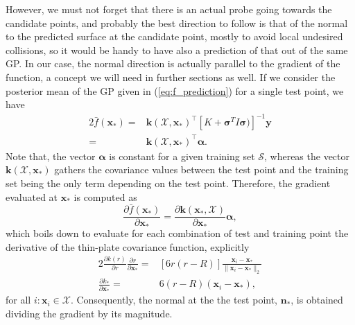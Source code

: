 However, we must not forget that there is an actual probe going towards the candidate points, and probably the best direction to follow is that of the normal to the predicted surface at the candidate point, mostly to avoid local undesired collisions, so it would be handy to have also a prediction of that out of the same GP. In our case, the normal direction is actually parallel to the gradient of the function, a concept we will need in further sections as well. If we consider the posterior mean of the GP given in (\ref{eq:f_prediction}) for a single test point, we have
\begin{alignat}{2}
\bar{f}(\mathbf{x}_*) = & \mathbf{k}(\mathcal{X},\mathbf{x}_*)^\top [K + \boldsymbol{\sigma}^{T} I \boldsymbol{\sigma})]^{-1}\mathbf{y} \nonumber \\ = & \mathbf{k}(\mathcal{X},\mathbf{x}_*)^\top \boldsymbol{\alpha}.
\end{alignat}
Note that, the vector $\boldsymbol{\alpha}$ is constant for a given training set $\mathcal{S}$, whereas the vector $\mathbf{k}(\mathcal{X},\mathbf{x}_*)$ gathers the covariance values between the test point and the training set being the only term depending on the test point. Therefore, the  gradient evaluated at $\mathbf{x}_*$ is computed as
\begin{equation}
 \frac{\partial \bar{f}(\mathbf{x}_*)}{\partial \mathbf{x}_*} = \frac{\partial \mathbf{k}(\mathbf{x}_*,\mathcal{X})}{\partial \mathbf{x}_*} \boldsymbol{\alpha}, \label{eq:gradient_f}
\end{equation}
which boils down to evaluate for each combination of test and training point the derivative of the thin-plate covariance function, explicitly
\begin{alignat}{2}
  \frac{\partial k(r)}{ \partial r} \frac{\partial r}{ \partial \mathbf{x}_*} = & [6r (r - R)] \frac{\mathbf{x}_i - \mathbf{x}_*}{\| \mathbf{x}_i - \mathbf{x}_* \|_2} \nonumber \\ \frac{\partial k_*}{ \partial \mathbf{x}_*} = & 6(r - R) (\mathbf{x}_i - \mathbf{x}_*),
\end{alignat}
for all $i : \mathbf{x}_i \in \mathcal{X}$. Consequently, the normal at the the test point, $\mathbf{n}_*$, is obtained dividing the gradient by its magnitude.



